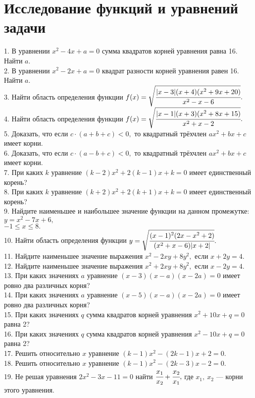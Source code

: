 \section{Исследование функций и уравнений задачи}
1. В уравнении $x^2-4x+a=0$ сумма квадратов корней уравнения равна 16. Найти $a.$\\
2. В уравнении $x^2-2x+a=0$ квадрат разности корней уравнения равен 16. Найти $a.$\\
3. Найти область определения функции $f(x)=\sqrt{\cfrac{|x-3|(x+4)(x^2+9x+20)}{x^2-x-6}}.$\\
4. Найти область определения функции $f(x)=\sqrt{\cfrac{|x-1|(x+3)(x^2+8x+15)}{x^2+x-2}}.$\\
5. Доказать, что если $c\cdot(a+b+c)<0,$ то квадратный трёхчлен $ax^2+bx+c$ имеет корни.\\
6. Доказать, что если $c\cdot(a-b+c)<0,$ то квадратный трёхчлен $ax^2+bx+c$ имеет корни.\\
7. При каких $k$ уравнение $(k-2)x^2+2(k-1)x+k=0$ имеет единственный корень?\\
8. При каких $k$ уравнение $(k+2)x^2+2(k+1)x+k=0$ имеет единственный корень?\\
9. Найдите наименьшее и наибольшее значение функции на данном промежутке: $y=x^2-7x+6,$ \\
$-1\le x\le 8.$\\
10. Найти область определения функции $y=\sqrt{\cfrac{(x-1)^2(2x-x^2+2)}{(x^2+x-6)|x+2|}}.$\\
11. Найдите наименьшее значение выражения $x^2-2xy+8y^2,$
если $x+2y=4.$\\
12. Найдите наименьшее значение выражения $x^2+2xy+8y^2,$
если $x-2y=4.$\\
13. При каких значениях $a$ уравнение $(x-3)(x-a)(x-2a)=0$ имеет ровно два различных корня?\\
14. При каких значениях $a$ уравнение $(x-5)(x-a)(x-2a)=0$ имеет ровно два различных корня?\\
15. При каких значениях $q$ сумма квадратов корней уравнения $x^2+10x+q=0$ равна 2?\\
16. При каких значениях $q$ сумма квадратов корней уравнения $x^2-10x+q=0$ равна 2?\\
17. Решить относительно $x$ уравнение $(k-1)x^2-(2k-1)x+2=0.$\\
18. Решить относительно $x$ уравнение $(k-1)x^2-(2k-3)x-2=0.$\\
19. Не решая уравнения $2x^2-3x-11=0$ найти $\cfrac{x_1}{x_2}+\cfrac{x_2}{x_1},$ где $x_1,\ x_2$ --- корни этого уравнения.\\
